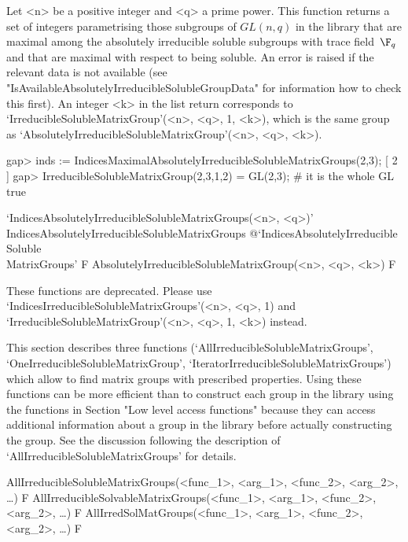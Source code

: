 Let <n> be a  positive integer and <q> a prime power. This
function returns a set of integers parametrising those subgroups of $GL(n, q)$ in the
{\IRREDSOL} library that are maximal among the absolutely irreducible soluble subgroups with  trace field~$\F_q $ and that are maximal with
respect to being soluble. An error is raised if the relevant
data is not available (see "IsAvailableAbsolutelyIrreducibleSolubleGroupData" for information 
how to check this first). An integer <k> in the list return corresponds to `IrreducibleSolubleMatrixGroup'(<n>, <q>, 1, <k>), which is the same group as
`AbsolutelyIrreducibleSolubleMatrixGroup'(<n>, <q>, <k>).

\beginexample
gap> inds := IndicesMaximalAbsolutelyIrreducibleSolubleMatrixGroups(2,3);
[ 2 ] 
gap> IrreducibleSolubleMatrixGroup(2,3,1,2) = GL(2,3); # it is the whole GL
true
\endexample


\>`IndicesAbsolutelyIrreducibleSolubleMatrixGroups(<n>, <q>)'%
{IndicesAbsolutelyIrreducibleSolubleMatrixGroups}%
@{`IndicesAbsolutelyIrreducible\\Soluble\\MatrixGroups'} F
\>AbsolutelyIrreducibleSolubleMatrixGroup(<n>, <q>,  <k>) F

These functions are deprecated.  Please use `IndicesIrreducibleSolubleMatrixGroups'(<n>, <q>, 1) and `IrreducibleSolubleMatrixGroup'(<n>, <q>, 1, <k>) instead.


\null



This section describes three functions
(`AllIrreducibleSolubleMatrixGroups',
`OneIrreducibleSolubleMatrixGroup',
`IteratorIrreducibleSolubleMatrixGroups') which allow to find matrix
groups with prescribed properties. Using these functions can be more efficient
than to construct each group in the library using the functions in Section
"Low level access functions" because they can access additional information 
about a group in the {\IRREDSOL} library before actually constructing the group. 
See the discussion following the description of 
`AllIrreducibleSolubleMatrixGroups' for details. 

\>AllIrreducibleSolubleMatrixGroups(<func_1>, <arg_1>, <func_2>, <arg_2>, \dots) F
\>AllIrreducibleSolvableMatrixGroups(<func_1>, <arg_1>, <func_2>, <arg_2>, \dots) F
\>AllIrredSolMatGroups(<func_1>, <arg_1>, <func_2>, <arg_2>, \dots) F

